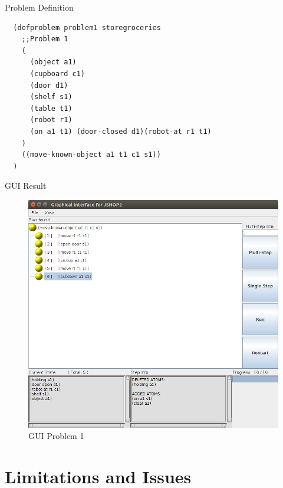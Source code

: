 \documentclass{beamer}
\begin{document}
\begin{frame}{Problem Definition}
  \begin{lstlisting}
  (defproblem problem1 storegroceries
    ;;Problem 1
    (
      (object a1)
      (cupboard c1)
      (door d1)
      (shelf s1)
      (table t1)
      (robot r1)
      (on a1 t1) (door-closed d1)(robot-at r1 t1)
    )
    ((move-known-object a1 t1 c1 s1))
  )
  \end{lstlisting}
\end{frame}


%

\begin{frame}{GUI Result}
  \begin{figure}[h!]
    \centering
    \includegraphics[width=0.65\linewidth]{images/problem1_gui}
    \caption{GUI Problem 1}
    \label{fig:probem1_gui}
  \end{figure}
\end{frame}


\section{Limitations and Issues}
\end{document}
